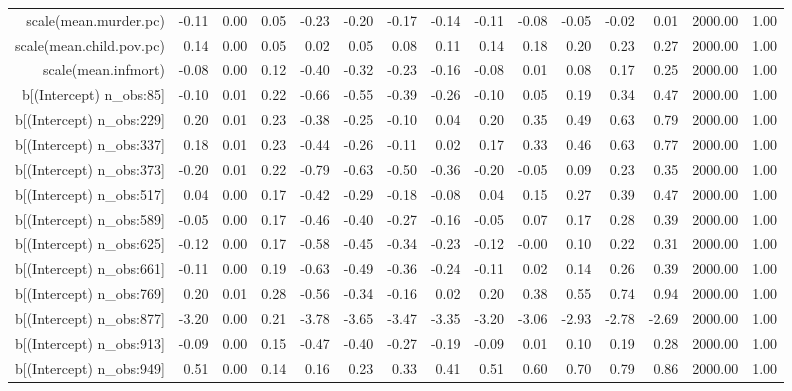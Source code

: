 \begin{table}[ht]
\begin{tabular}{rrrrrrrrrrrrrrr}
  scale(mean.murder.pc) & -0.11 & 0.00 & 0.05 & -0.23 & -0.20 & -0.17 & -0.14 & -0.11 & -0.08 & -0.05 & -0.02 & 0.01 & 2000.00 & 1.00 \\ 
  scale(mean.child.pov.pc) & 0.14 & 0.00 & 0.05 & 0.02 & 0.05 & 0.08 & 0.11 & 0.14 & 0.18 & 0.20 & 0.23 & 0.27 & 2000.00 & 1.00 \\ 
  scale(mean.infmort) & -0.08 & 0.00 & 0.12 & -0.40 & -0.32 & -0.23 & -0.16 & -0.08 & 0.01 & 0.08 & 0.17 & 0.25 & 2000.00 & 1.00 \\ 
  b[(Intercept) n\_obs:85] & -0.10 & 0.01 & 0.22 & -0.66 & -0.55 & -0.39 & -0.26 & -0.10 & 0.05 & 0.19 & 0.34 & 0.47 & 2000.00 & 1.00 \\ 
  b[(Intercept) n\_obs:229] & 0.20 & 0.01 & 0.23 & -0.38 & -0.25 & -0.10 & 0.04 & 0.20 & 0.35 & 0.49 & 0.63 & 0.79 & 2000.00 & 1.00 \\ 
  b[(Intercept) n\_obs:337] & 0.18 & 0.01 & 0.23 & -0.44 & -0.26 & -0.11 & 0.02 & 0.17 & 0.33 & 0.46 & 0.63 & 0.77 & 2000.00 & 1.00 \\ 
  b[(Intercept) n\_obs:373] & -0.20 & 0.01 & 0.22 & -0.79 & -0.63 & -0.50 & -0.36 & -0.20 & -0.05 & 0.09 & 0.23 & 0.35 & 2000.00 & 1.00 \\ 
  b[(Intercept) n\_obs:517] & 0.04 & 0.00 & 0.17 & -0.42 & -0.29 & -0.18 & -0.08 & 0.04 & 0.15 & 0.27 & 0.39 & 0.47 & 2000.00 & 1.00 \\ 
  b[(Intercept) n\_obs:589] & -0.05 & 0.00 & 0.17 & -0.46 & -0.40 & -0.27 & -0.16 & -0.05 & 0.07 & 0.17 & 0.28 & 0.39 & 2000.00 & 1.00 \\ 
  b[(Intercept) n\_obs:625] & -0.12 & 0.00 & 0.17 & -0.58 & -0.45 & -0.34 & -0.23 & -0.12 & -0.00 & 0.10 & 0.22 & 0.31 & 2000.00 & 1.00 \\ 
  b[(Intercept) n\_obs:661] & -0.11 & 0.00 & 0.19 & -0.63 & -0.49 & -0.36 & -0.24 & -0.11 & 0.02 & 0.14 & 0.26 & 0.39 & 2000.00 & 1.00 \\ 
  b[(Intercept) n\_obs:769] & 0.20 & 0.01 & 0.28 & -0.56 & -0.34 & -0.16 & 0.02 & 0.20 & 0.38 & 0.55 & 0.74 & 0.94 & 2000.00 & 1.00 \\ 
  b[(Intercept) n\_obs:877] & -3.20 & 0.00 & 0.21 & -3.78 & -3.65 & -3.47 & -3.35 & -3.20 & -3.06 & -2.93 & -2.78 & -2.69 & 2000.00 & 1.00 \\ 
  b[(Intercept) n\_obs:913] & -0.09 & 0.00 & 0.15 & -0.47 & -0.40 & -0.27 & -0.19 & -0.09 & 0.01 & 0.10 & 0.19 & 0.28 & 2000.00 & 1.00 \\ 
  b[(Intercept) n\_obs:949] & 0.51 & 0.00 & 0.14 & 0.16 & 0.23 & 0.33 & 0.41 & 0.51 & 0.60 & 0.70 & 0.79 & 0.86 & 2000.00 & 1.00 \\ 

\end{tabular}
\end{table}
